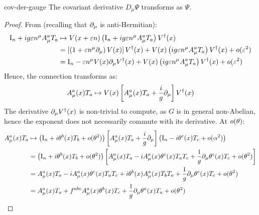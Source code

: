 \begin{proposition}{}{cov-der-gauge}
  The covariant derivative $ D_\mu \Psi $ transforms as $ \Psi $.
\end{proposition}

\begin{proofbox}
  \begin{proof}
    From  (recalling that $ \partial_\mu $ is anti-Hermitian):
    \begin{equation*}
      \begin{split}
        \mathrm{I}_n + i g \varepsilon n^\mu A_\mu^a T_a
        & \mapsto V(x + \varepsilon n) \left( \mathrm{I}_n + i g \varepsilon n^\mu A_\mu^a T_a \right) V^\dagger(x) \\
        & = \left[ \left( 1 + \varepsilon n^\mu \partial_\mu \right) V(x) \right] V^\dagger(x) + V(x) \left( i g \varepsilon n^\mu A_\mu^a T_a \right) V^\dagger(x) + o(\varepsilon^2) \\
        & = \mathrm{I}_n - \varepsilon n^\mu V(x) \partial_\mu V^\dagger(x) + V(x) \left( i g \varepsilon n^\mu A_\mu^a T_a \right) V^\dagger(x) + o(\varepsilon^2)
      \end{split}
    \end{equation*}
    Hence, the connection transforms as:
    \begin{equation*}
      A_\mu^a(x) T_a \mapsto V(x) \left[ A_\mu^a(x) T_a + \frac{i}{g} \partial_\mu \right] V^\dagger(x)
    \end{equation*}
    The derivative $ \partial_\mu V^\dagger(x) $ is non-trivial to compute, as $ G $ is in general non-Abelian, hence the exponent does not necessarily commute with its derivative. At $ o(\theta) $:
    \begin{equation*}
      \begin{split}
        A_\mu^a(x) T_a
        & \mapsto \left( \tens{I}_n + i \theta^b(x) T_b + \smo(\theta^2) \right) \left[ A_\mu^a(x) T_a + \frac{i}{g} \pa_\mu \right] \left( \tens{I}_n - i \theta^c(x) T_c + \smo(\alpha^2) \right) \\
        & = \left( \tens{I}_n + i \theta^b(x) T_b + \smo(\theta^2) \right) \left[ A_\mu^a(x) T_a - i A_\mu^a(x) \theta^c(x) T_a T_c + \frac{1}{g} \pa_\mu \theta^c(x) T_c + \smo(\theta^2) \right] \\
        & = A_\mu^a(x) T_a - i A_\mu^a(x) \theta^c(x) T_a T_c + i \theta^b(x) A_\mu^a(x) T_b T_a + \frac{1}{g} \pa_\mu \theta^c(x) T_c + \smo(\theta^2) \\
        & = A_\mu^a(x) T_a + f^{abc} A_\mu^a(x) \theta^b(x) T_c + \frac{1}{g} \pa_\mu \theta^a(x) T_a + \smo(\theta^2)

\end{split}
\end{equation*}
\end{proof}
\end{proofbox}
